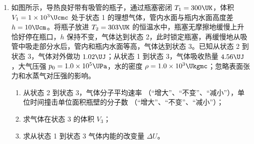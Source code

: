 \documentclass[\gkver]{gaokaozhenti}
\begin{document}
\begin{enumerate}
{（3）题中滑片 P 位置保持不变，则电阻箱 $R_{1}$ 与热敏电阻 $R_{t}$ 两端电压之和保持不变。先让 $S_{2}$ 接 a，此时电压表读数为 $U$，然后接 b，读出电阻箱 $R_{1}$ 的读数和电压表读数 $U'$，可得

$\frac{U}{R_{1} + R_{t}} = \frac{U'}{R_{1}}$

以后保持 $S_{2}$ 接 b，改变电阻箱的阻值 $R_{1}$，根据

$R_{t} = \left( \frac{U}{U'} - 1 \right)R_{1}$

可得热敏电阻 $R_{t}$ 的值。
}

\item
如图所示，导热良好带有吸管的瓶子，通过瓶塞密闭 $T_{1} = 300 \UK$，体积 $V_{1} = 1 \times 10^{3} \Ucmc$ 处于状态 1 的理想气体，管内水面与瓶内水面高度差 $h = 10 \Ucm$。将瓶子放进 $T_{2} = 303 \UK$ 的恒温水中，瓶塞无摩擦地缓慢上升恰好停在瓶口，$h$ 保持不变，气体达到状态 2，此时锁定瓶塞，再缓慢地从吸管中吸走部分水后，管内和瓶内水面等高，气体达到状态 3。已知从状态 2 到状态 3，气体对外做功 $1.02 \UJ$；从状态 1 到状态 3，气体吸收热量 $4.56 \UJ$，大气压强 $p_{0} = 1.0 \times 10^{5} \UPa$，水的密度 $\rho = 1.0 \times 10^{3} \Ukgmc$；忽略表面张力和水蒸气对压强的影响。

\begin{enumerate}
\item
从状态 2 到状态 3，气体分子平均速率 （“增大”、“不变”、“减小”），单位时间撞击单位面积瓶壁的分子数 （“增大”、“不变”、“减小”）；

\item
求气体在状态 3 的体积 $V_{3}$；

\item
求从状态 1 到状态 3 气体内能的改变量 $\Delta U$。
\end{enumerate}


\end{enumerate}
\end{document}

